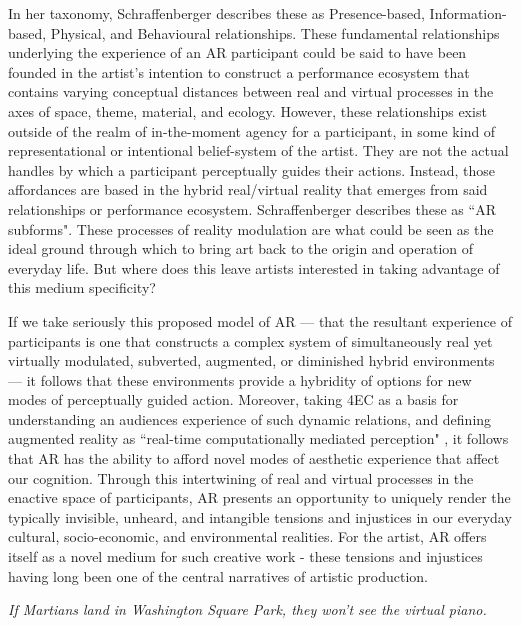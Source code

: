 In her taxonomy, Schraffenberger describes these as Presence-based, Information-based, Physical, and Behavioural relationships. These fundamental relationships underlying the experience of an AR participant could be said to have been founded in the artist's intention to construct a performance ecosystem that contains varying conceptual distances between real and virtual processes in the axes of space, theme, material, and ecology. However, these relationships exist outside of the realm of in-the-moment agency for a participant, in some kind of representational or intentional belief-system of the artist. They are not the actual handles by which a participant perceptually guides their actions. Instead, those affordances are based in the hybrid real/virtual reality that emerges from said relationships or performance ecosystem. Schraffenberger describes these as ``AR subforms". These processes of reality modulation are what could be seen as the ideal ground through which to bring art back to the origin and operation of everyday life. But where does this leave artists interested in taking advantage of this medium specificity? 

If we take seriously this proposed model of AR — that the resultant experience of participants is one that constructs a complex system of simultaneously real yet virtually modulated, subverted, augmented, or diminished hybrid environments — it follows that these environments provide a hybridity of options for new modes of perceptually guided action. Moreover, taking 4EC as a basis for understanding an audiences experience of such dynamic relations, and defining augmented reality as ``real-time computationally mediated perception" \citep[]{chevalier2020}, it follows that AR has the ability to afford novel modes of aesthetic experience that affect our cognition. Through this intertwining of real and virtual processes in the enactive space of participants, AR presents an opportunity to uniquely render the typically invisible, unheard, and intangible tensions and injustices in our everyday cultural, socio-economic, and environmental realities. For the artist, AR offers itself as a novel medium for such creative work - these tensions and injustices having long been one of the central narratives of artistic production.
\clearpage
\newpage



\epigraph{\textit{If Martians land in Washington Square Park, they won't see the virtual piano.}}{\citep[p. 229]{chalmers2022}}
